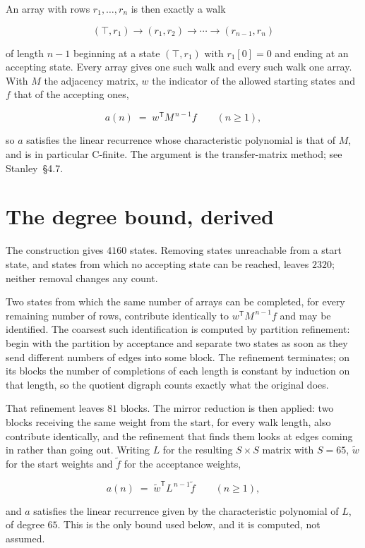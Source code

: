 \documentclass[11pt]{article}
\theoremstyle{definition}
\begin{document}
An array with rows $r_1,\dots,r_n$ is then exactly a walk

\[(\top,r_1) \to (r_1,r_2) \to \cdots \to (r_{n-1},r_n)\]

of length $n-1$ beginning at a state $(\top,r_1)$ with $r_1[0]=0$ and ending at an accepting state. Every array gives one such walk and every such walk one array. With $M$ the adjacency matrix, $w$ the indicator of the allowed starting states and $f$ that of the accepting ones,

\[a(n) \;=\; w^{\mathsf T} M^{\,n-1} f \qquad (n \ge 1),\]

so $a$ satisfies the linear recurrence whose characteristic polynomial is that of $M$, and is in particular C-finite. The argument is the transfer-matrix method; see Stanley~\S4.7.

\section{The degree bound, derived}

The construction gives $4160$ states. Removing states unreachable from a start state, and states from which no accepting state can be reached, leaves $2320$; neither removal changes any count.

Two states from which the same number of arrays can be completed, for every remaining number of rows, contribute identically to $w^{\mathsf T}M^{\,n-1}f$ and may be identified. The coarsest such identification is computed by partition refinement: begin with the partition by acceptance and separate two states as soon as they send different numbers of edges into some block. The refinement terminates; on its blocks the number of completions of each length is constant by induction on that length, so the quotient digraph counts exactly what the original does.

That refinement leaves $81$ blocks. The mirror reduction is then applied: two blocks receiving the same weight from the start, for every walk length, also contribute identically, and the refinement that finds them looks at edges coming in rather than going out. Writing $L$ for the resulting $S \times S$ matrix with $S = 65$, $\tilde w$ for the start weights and $\tilde f$ for the acceptance weights,

\[a(n) \;=\; \tilde w^{\mathsf T} L^{\,n-1} \tilde f \qquad (n \ge 1),\]

and $a$ satisfies the linear recurrence given by the characteristic polynomial of $L$, of degree $65$. This is the only bound used below, and it is computed, not assumed.
\end{document}
